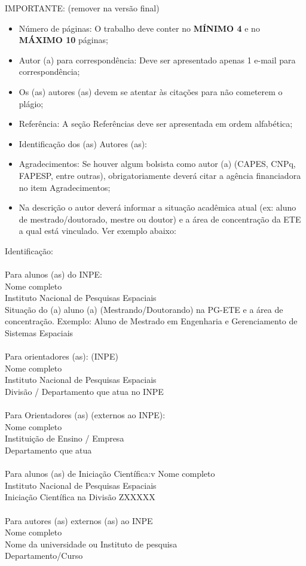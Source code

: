 \documentclass[12pt]{article}
\begin{document}
\textcolor[rgb]{1,0,0}{
IMPORTANTE: (remover na versão final)
\begin{itemize}
	\item Número de páginas: O trabalho deve conter no \textbf{MÍNIMO 4} e no \textbf{MÁXIMO 10} páginas;
	\item Autor (a) para correspondência: Deve ser apresentado apenas 1 e-mail para correspondência;
	\item Os (as) autores (as) devem se atentar às citações para não cometerem o plágio;
	\item Referência: A seção Referências deve ser apresentada em ordem alfabética;
	\item Identificação dos (as) Autores (as): 
	\item Agradecimentos: Se houver algum bolsista como autor (a) (CAPES, CNPq, FAPESP, entre outras), obrigatoriamente deverá citar a agência financiadora no item Agradecimentos;
	\item Na descrição o autor deverá informar a situação acadêmica atual (ex: aluno de mestrado/doutorado, mestre ou doutor) e a área de concentração da ETE a qual está vinculado. Ver exemplo abaixo:
\end{itemize}
Identificação:\\\\
Para alunos (as) do INPE:\\
Nome completo\\
Instituto Nacional de Pesquisas Espaciais\\
Situação do (a) aluno (a) (Mestrando/Doutorando) na PG-ETE e a área de concentração. Exemplo: Aluno de Mestrado em Engenharia e Gerenciamento de Sistemas Espaciais\\\\
Para orientadores (as): (INPE)\\
Nome completo\\
Instituto Nacional de Pesquisas Espaciais\\
Divisão / Departamento que atua no INPE\\\\
Para Orientadores (as) (externos ao INPE):\\
Nome completo\\
Instituição de Ensino / Empresa\\
Departamento que atua\\\\
Para alunos (as) de Iniciação Científica:v
Nome completo\\
Instituto Nacional de Pesquisas Espaciais\\
Iniciação Científica na Divisão ZXXXXX\\\\
Para autores (as) externos (as) ao INPE\\
Nome completo\\
Nome da universidade ou Instituto de pesquisa\\
Departamento/Curso\\\\
}
\end{document}
